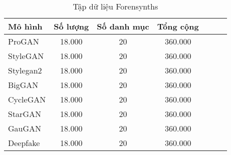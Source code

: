 \begin{table}[h]%
	\scriptsize 
	\renewcommand{\arraystretch}{1.2} %
	\centering
	\caption{Tập dữ liệu Forensynths}
	\label{tab:forensynths-dataset}
	\begin{tabular}{|l|c|c|c|c|c|c|}
		\hline
		\textbf{Mô hình} & \textbf{Số lượng} & \textbf{Số danh mục} & \textbf{Tổng cộng} \\ \hline
		ProGAN & 18.000 & 20 & 360.000 \\ 
		StyleGAN  & 18.000 & 20 & 360.000 \\ 
		Stylegan2 & 18.000 & 20 & 360.000 \\  
		BigGAN & 18.000 & 20 & 360.000 \\  
		CycleGAN & 18.000 & 20 & 360.000 \\  
		StarGAN & 18.000 & 20 & 360.000 \\  
		GauGAN & 18.000 & 20 & 360.000 \\  
		Deepfake & 18.000 & 20 & 360.000 \\ 
		\hline
	\end{tabular}
\end{table}


